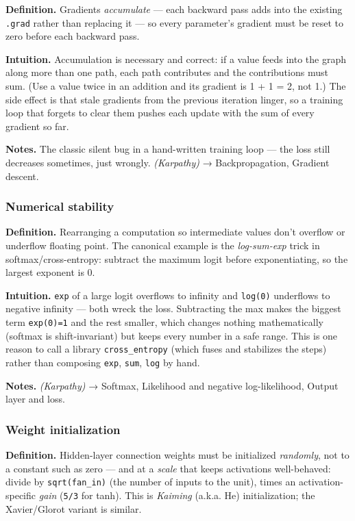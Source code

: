 \documentclass[
  10pt,
  letterpaper,
  onecolumn]{article}
\begin{document}
\textbf{Definition.} Gradients \emph{accumulate} --- each backward pass
adds into the existing \texttt{.grad} rather than replacing it --- so
every parameter's gradient must be reset to zero before each backward
pass.

\textbf{Intuition.} Accumulation is necessary and correct: if a value
feeds into the graph along more than one path, each path contributes and
the contributions must sum. (Use a value twice in an addition and its
gradient is 1 + 1 = 2, not 1.) The side effect is that stale gradients
from the previous iteration linger, so a training loop that forgets to
clear them pushes each update with the sum of every gradient so far.

\textbf{Notes.} The classic silent bug in a hand-written training loop
--- the loss still decreases sometimes, just wrongly. \emph{(Karpathy)}
→ Backpropagation, Gradient descent.

\hypertarget{numerical-stability}{%
\subsubsection{Numerical stability}\label{numerical-stability}}

\textbf{Definition.} Rearranging a computation so intermediate values
don't overflow or underflow floating point. The canonical example is the
\emph{log-sum-exp} trick in softmax/cross-entropy: subtract the maximum
logit before exponentiating, so the largest exponent is 0.

\textbf{Intuition.} \texttt{exp} of a large logit overflows to infinity
and \texttt{log(0)} underflows to negative infinity --- both wreck the
loss. Subtracting the max makes the biggest term \texttt{exp(0)=1} and
the rest smaller, which changes nothing mathematically (softmax is
shift-invariant) but keeps every number in a safe range. This is one
reason to call a library \texttt{cross\_entropy} (which fuses and
stabilizes the steps) rather than composing \texttt{exp}, \texttt{sum},
\texttt{log} by hand.

\textbf{Notes.} \emph{(Karpathy)} → Softmax, Likelihood and negative
log-likelihood, Output layer and loss.

\hypertarget{weight-initialization}{%
\subsubsection{Weight initialization}\label{weight-initialization}}

\textbf{Definition.} Hidden-layer connection weights must be initialized
\emph{randomly}, not to a constant such as zero --- and at a
\emph{scale} that keeps activations well-behaved: divide by
\texttt{sqrt(fan\_in)} (the number of inputs to the unit), times an
activation-specific \emph{gain} (\texttt{5/3} for tanh). This is
\emph{Kaiming} (a.k.a. He) initialization; the Xavier/Glorot variant is
similar.
\end{document}
